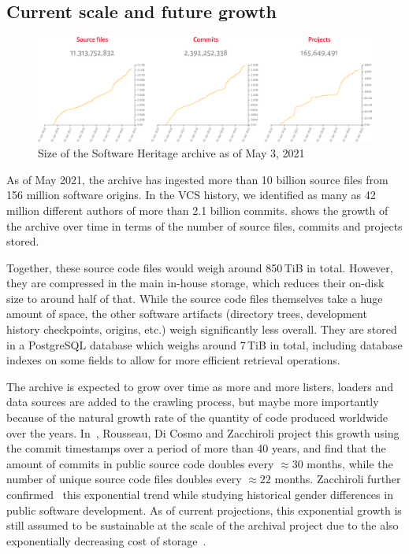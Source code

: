 \subsection{Current scale and future growth}

\begin{figure}
    \centering
    \includegraphics[width=0.9\linewidth]{img/swh-size}
    \caption{Size of the Software Heritage archive as of May 3, 2021}%
    \label{fig:swh-size}
\end{figure}

As of May 2021, the archive has ingested more than 10 billion source files from
156 million software origins. In the \gls{VCS} history, we identified as many
as 42 million different authors of more than 2.1 billion commits.
 shows the growth of the archive over time in terms of the
number of source files, commits and projects stored.

Together, these source code files would weigh around 850\,TiB in total.
However, they are compressed in the main in-house storage, which reduces their
on-disk size to around half of that. While the
source code files themselves take a huge amount of space, the other software
artifacts (directory trees, development history checkpoints, origins, etc.)
weigh significantly less overall. They are stored in a PostgreSQL database
which weighs around 7\,TiB in total, including database indexes on some fields
to allow for more efficient retrieval operations.

The archive is expected to grow over time as more and more listers,
loaders and data sources are added to the crawling process, but maybe more
importantly because of the natural growth rate of the quantity of code produced
worldwide over the years. In~\cite{swh-provenance-emse}, Rousseau, Di Cosmo and
Zacchiroli project this growth using the commit timestamps over a period of
more than 40 years, and find that the amount of commits in public source code
doubles every $\approx 30$ months, while the number of unique source code files
doubles every $\approx 22$ months. Zacchiroli further
confirmed~\cite{ieee-sw-gender-swh} this exponential trend while studying
historical gender differences in public software development. As of current
projections, this exponential growth is still assumed to be sustainable at the
scale of the archival project due to the also exponentially decreasing cost of
storage~\cite{swh-provenance-emse}.

